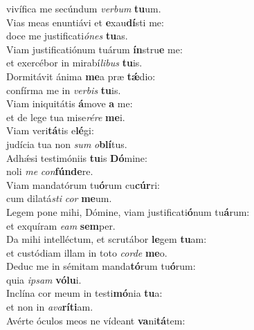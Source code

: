 \oddverse vivífica me secúndum \textit{ver}\textit{bum} \textbf{tu}um.\\
\evenverse Vias meas enuntiávi et \textbf{e}xau\textbf{dí}sti me:~\*\\
\evenverse doce me justificati\textit{ó}\textit{nes} \textbf{tu}as.\\
\oddverse Viam justificatiónum tuárum \textbf{ín}stru\textbf{e} me:~\*\\
\oddverse et exercébor in mirabí\textit{li}\textit{bus} \textbf{tu}is.\\
\evenverse Dormitávit ánima \textbf{me}a præ \textbf{tǽ}dio:~\*\\
\evenverse confírma me in \textit{ver}\textit{bis} \textbf{tu}is.\\
\oddverse Viam iniquitátis \textbf{á}move \textbf{a} me:~\*\\
\oddverse et de lege tua mise\textit{ré}\textit{re} \textbf{me}i.\\
\evenverse Viam veri\textbf{tá}tis e\textbf{lé}gi:~\*\\
\evenverse judícia tua non \textit{sum} \textit{o}\textbf{blí}tus.\\
\oddverse Adhǽsi testimóniis \textbf{tu}is \textbf{Dó}mine:~\*\\
\oddverse noli \textit{me} \textit{con}\textbf{fún}\textbf{de}re.\\
\evenverse Viam mandatórum tu\textbf{ó}rum cu\textbf{cúr}ri:~\*\\
\evenverse cum dilatá\textit{sti} \textit{cor} \textbf{me}um.\\
\oddverse Legem pone mihi, Dómine, viam justificati\textbf{ó}num tu\textbf{á}rum:~\*\\
\oddverse et exquíram \textit{e}\textit{am} \textbf{sem}per.\\
\evenverse Da mihi intelléctum, et scrutábor \textbf{le}gem \textbf{tu}am:~\*\\
\evenverse et custódiam illam in toto \textit{cor}\textit{de} \textbf{me}o.\\
\oddverse Deduc me in sémitam manda\textbf{tó}rum tu\textbf{ó}rum:~\*\\
\oddverse quia \textit{i}\textit{psam} \textbf{vó}\textbf{lu}i.\\
\evenverse Inclína cor meum in testi\textbf{mó}nia \textbf{tu}a:~\*\\
\evenverse et non in \textit{a}\textit{va}\textbf{rí}\textbf{ti}am.\\
\oddverse Avérte óculos meos ne vídeant \textbf{va}ni\textbf{tá}tem:~\*\\
